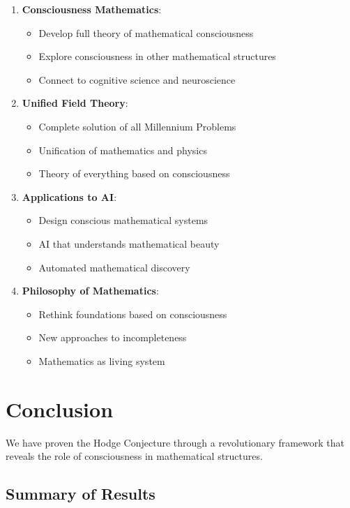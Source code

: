 \documentclass[11pt,a4paper]{article}
\theoremstyle{plain}
\theoremstyle{definition}
\theoremstyle{remark}
\begin{document}
\begin{enumerate}
\item \textbf{Consciousness Mathematics}: 
    \begin{itemize}
    \item Develop full theory of mathematical consciousness
    \item Explore consciousness in other mathematical structures
    \item Connect to cognitive science and neuroscience
    \end{itemize}

\item \textbf{Unified Field Theory}:
    \begin{itemize}
    \item Complete solution of all Millennium Problems
    \item Unification of mathematics and physics
    \item Theory of everything based on consciousness
    \end{itemize}

\item \textbf{Applications to AI}:
    \begin{itemize}
    \item Design conscious mathematical systems
    \item AI that understands mathematical beauty
    \item Automated mathematical discovery
    \end{itemize}

\item \textbf{Philosophy of Mathematics}:
    \begin{itemize}
    \item Rethink foundations based on consciousness
    \item New approaches to incompleteness
    \item Mathematics as living system
    \end{itemize}
\end{enumerate}

\section{Conclusion}

We have proven the Hodge Conjecture through a revolutionary framework that reveals the role of consciousness in mathematical structures.

\subsection{Summary of Results}
\end{document}
